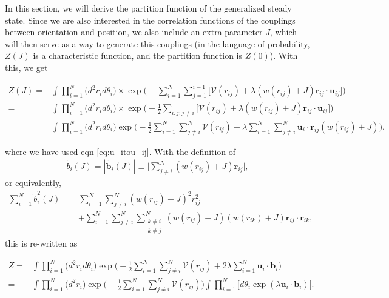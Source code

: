 \documentclass[../main.tex]{subfiles}
\begin{document}
In this section, we will derive the partition function of the
generalized steady state. Since we are also interested in the
correlation functions of the couplings between orientation and
position, we also include an extra parameter $J$, which will
then serve as a way to generate this couplings (in the language
of probability, $Z(J)$ is a characteristic function, and the
partition function is $Z(0)$). With this, we get
\begin{widetext}
\begin{align}\label{appeq:genfunc}
  Z(J)
  =&\int\prod_{i=1}^N\big(d^2r_id\theta_i)
  \times\exp\bigg(-\sum_{i=1}^N\sum_{j=1}^{i-1}\big[
    \mathcal{V}(r_{ij})+\lambda (w(r_{ij})+J)\bm{r}_{ij}
    \cdot\bm{u}_{ij}\big]\bigg)\nonumber\\
  =&\int\prod_{i=1}^N\big(d^2r_id\theta_i)
  \times\exp\bigg(-\frac{1}{2}\sum_{i,j;j\neq i}\big[
    \mathcal{V}(r_{ij})+\lambda (w(r_{ij})+J)\bm{r}_{ij}
    \cdot\bm{u}_{ij}\big]\bigg)\nonumber\\
  =&\int\prod_{i=1}^N\big(d^2r_id\theta_i)
  \exp\bigg(-\frac{1}{2}\sum_{i=1}^N\sum_{j\neq i}^N
  \mathcal{V}(r_{ij})
  +\lambda\sum_{i=1}^N\sum_{j\neq i}^N\bm{u}_{i}
  \cdot \bm{r}_{ij}(w(r_{ij})+J)\bigg).
\end{align}
\end{widetext}
where we have used eqn \ref{eq:u_itou_ij}. With the definition of
\begin{align}\label{appeq:b_i}
  \tilde{b}_i(J) = |\tilde{\bm{b}}_i(J)|\equiv
  \bigg|\sum_{j\neq i}^N(w(r_{ij})+J)
  \bm{r}_{ij}\bigg|,
\end{align}
or equivalently,
\begin{align}\label{appeq:b_i2}
  \sum_{i=1}^N\tilde{b}_i^2(J)
  =&\sum_{i=1}^N\sum_{j\neq i}^N(w(r_{ij})+J)^2r_{ij}^2\nonumber\\
  &+\sum_{i=1}^N\sum_{j\neq i}^N\sum_{\substack{k\neq i \\ k\neq j}}^N
  (w(r_{ij})+J)(w(r_{ik})+J)\bm{r}_{ij}\cdot\bm{r}_{ik},
\end{align}
this is re-written as
\begin{widetext}
\begin{align}
  Z=&\int\prod_{i=1}^N\big(d^2r_id\theta_i)
     \exp\bigg(-\frac{1}{2}\sum_{i=1}^N\sum_{j\neq i}^N
     \mathcal{V}(r_{ij})+2\lambda\sum_{i=1}^N\bm{u}_{i}
     \cdot \bm{b}_{i}\bigg)\nonumber\\
  =&\int\prod_{i=1}^N\big(d^2r_i)
     \exp\bigg(-\frac{1}{2}\sum_{i=1}^N\sum_{j\neq i}^N
     \mathcal{V}(r_{ij})\bigg)\int\prod_{i=1}^N\bigg[d\theta_i
     \exp(\lambda\bm{u}_{i}\cdot \bm{b}_{i})\bigg].
\end{align}
\end{widetext}
\end{document}
